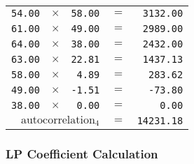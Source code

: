 {\begin{multicols}{2}
\begin{tabular}{rrrrr}
  \texttt{54.00} & $\times$ & \texttt{58.00} & $=$ & \texttt{3132.00} \\
  \texttt{61.00} & $\times$ & \texttt{49.00} & $=$ & \texttt{2989.00} \\
  \texttt{64.00} & $\times$ & \texttt{38.00} & $=$ & \texttt{2432.00} \\
  \texttt{63.00} & $\times$ & \texttt{22.81} & $=$ & \texttt{1437.13} \\
  \texttt{58.00} & $\times$ & \texttt{4.89} & $=$ & \texttt{283.62} \\
  \texttt{49.00} & $\times$ & \texttt{-1.51} & $=$ & \texttt{-73.80} \\
  \texttt{38.00} & $\times$ & \texttt{0.00} & $=$ & \texttt{0.00} \\
  \hline
  \multicolumn{3}{r}{$\text{autocorrelation}_4$} & $=$ & \texttt{14231.18} \\
\end{tabular}
\end{multicols}
}

\clearpage

\subsubsection{LP Coefficient Calculation}

